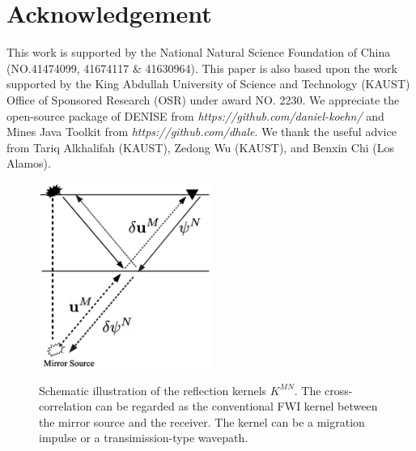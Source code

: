 \documentclass[extra,mreferee]{gji}
\begin{document}
\section{Acknowledgement}
This work is supported by the
National Natural Science Foundation of China (NO.41474099, 41674117 \& 41630964). 
This paper is also based upon the work supported by the King Abdullah University of Science
and Technology (KAUST) Office of Sponsored Research (OSR) under award NO. 2230.
We appreciate the open-source package of DENISE from
\textit{https://github.com/daniel-koehn/} and Mines Java Toolkit from
\textit{https://github.com/dhale}.
We thank the useful advice from Tariq Alkhalifah (KAUST), Zedong Wu (KAUST),
and Benxin Chi (Los Alamos).
\clearpage
\begin{figure}
   \centering
   {\includegraphics[width=0.5\textwidth]{Kernel/Combinations/K_MN.eps}}
   \caption{Schematic illustration of the reflection kernels $K^{MN}$. The
   cross-correlation can be regarded as the conventional FWI kernel between the mirror
   source and the receiver. The kernel can be a migration impulse or a
   transimission-type wavepath.}
   \label{fig:kernel_mirror_src}
\end{figure}
\end{document}
